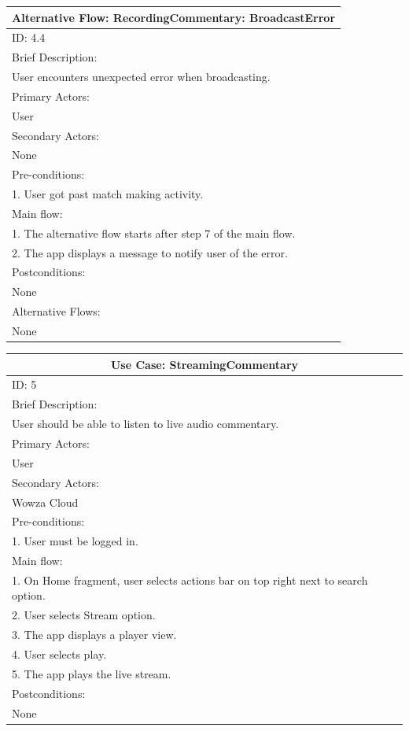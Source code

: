 \documentclass{article}
\begin{document}
\begin{flushleft}
\begin{longtable}[l]{|l|}
\hline
Alternative Flow: RecordingCommentary: BroadcastError\\
\hline
ID: 4.4\\
\hline
Brief Description: \\
User encounters unexpected error when broadcasting.\\
\hline
Primary Actors:\\
User\\
\hline
Secondary Actors:\\
None\\
\hline
Pre-conditions:\\
1. User got past match making activity.\\
\hline
Main flow:\\
1. The alternative flow starts after step 7 of the main flow.\\
2. The app displays a message to notify user of the error.\\
\hline
Postconditions:\\
None\\
\hline
Alternative Flows:\\
None\\
\hline
\end{longtable}
\begin{longtable}[l]{|l|}
\hline
\multicolumn{1}{|c|}{Use Case: StreamingCommentary}\\
\hline
ID: 5\\
\hline
Brief Description: \\
User should be able to listen to live audio commentary.\\
\hline
Primary Actors:\\
User\\
\hline
Secondary Actors:\\
Wowza Cloud\\
\hline
Pre-conditions:\\
1. User must be logged in.\\
\hline
Main flow:\\
1. On Home fragment, user selects actions bar on top right next to search option.\\
2. User selects Stream option.\\
3. The app displays a player view.\\
4. User selects play.\\
5. The app plays the live stream.\\
\hline
Postconditions:\\
None\\
\hline

\end{longtable}
\end{flushleft}
\end{document}
